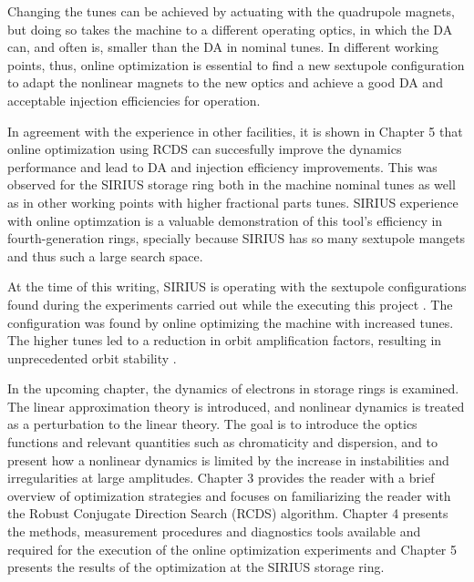 Changing the tunes can be achieved by actuating with the quadrupole magnets, but doing so takes the machine to a different operating optics, in which the DA can, and often is, smaller than the DA in nominal tunes. In different working points, thus, online optimization is essential to find a new sextupole configuration to adapt the nonlinear magnets to the new optics and achieve a good DA and acceptable injection efficiencies for operation.

In agreement with the experience in other facilities, it is shown in Chapter 5 that online optimization using RCDS can succesfully improve the dynamics performance and lead to DA and injection efficiency improvements. This was observed for the SIRIUS storage ring both in the machine nominal tunes as well as in other working points with higher fractional parts tunes.  SIRIUS experience with online optimzation is a valuable demonstration of this tool's efficiency in fourth-generation rings, specially because SIRIUS has so many sextupole mangets and thus such a large search space.

At the time of this writing, SIRIUS is operating with the sextupole configurations found during the experiments carried out while the executing this project \cite{velloso_online_2023}. The configuration was found by online optimizing the machine with increased tunes. The higher tunes led to a reduction in orbit amplification factors, resulting in unprecedented orbit stability \cite{liu_status_2023}.

In the upcoming chapter, the dynamics of electrons in storage rings is examined. The linear approximation theory is introduced, and nonlinear dynamics is treated as a perturbation to the linear theory. The goal is to introduce the optics functions and relevant quantities such as chromaticity and dispersion, and to present how a nonlinear dynamics is limited by the increase in instabilities and irregularities at large amplitudes. Chapter 3 provides the reader with a brief overview of optimization strategies and focuses on familiarizing the reader with the Robust Conjugate Direction Search (RCDS) algorithm. Chapter 4 presents the methods, measurement procedures and diagnostics tools available and required for the execution of the online optimization experiments and Chapter 5 presents the results of the optimization at the SIRIUS storage ring.
